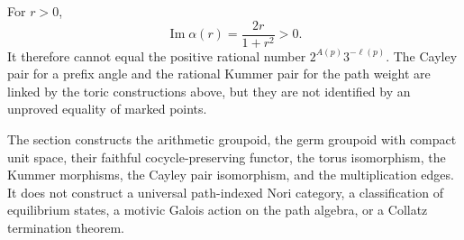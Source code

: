 For $r>0$,
\[
 \operatorname{Im}\alpha(r)=\frac{2r}{1+r^2}>0.
\]
It therefore cannot equal the positive rational number
$2^{A(p)}3^{-\ell(p)}$.  The Cayley pair for a prefix angle and the rational
Kummer pair for the path weight are linked by the toric constructions above,
but they are not identified by an unproved equality of marked points.

\begin{nonclaim}
The section constructs the arithmetic groupoid, the germ groupoid with
compact unit space,
their faithful cocycle-preserving functor, the torus isomorphism, the Kummer
morphisms, the Cayley pair isomorphism, and the multiplication edges.  It
does not construct a universal path-indexed Nori category, a classification
of equilibrium states, a motivic Galois action on the path algebra, or a
Collatz termination theorem.
\end{nonclaim}
